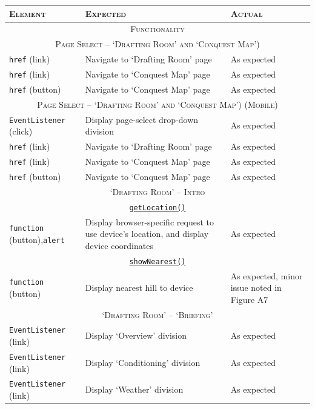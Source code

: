 \documentclass[11pt, english]{article}
\begin{document}
	\begin{center}
		\scriptsize
	\begin{longtable}{p{3cm}p{8cm}p{2cm}}
		\textsc{Element} & \textsc{Expected} & \textsc{Actual}\\
		\hline
		\hline
		\multicolumn{3}{c}{\textsc{Functionality}}\\
		\hline
		\hline
		\multicolumn{3}{c}{\textsc{Page Select -- `Drafting Room' and `Conquest Map')}}\\
		\hline
		\texttt{href} (link) & Navigate to `Drafting Room' page & As expected\\
		\texttt{href} (link) & Navigate to `Conquest Map' page & As expected\\
		\texttt{href} (button) & Navigate to `Conquest Map' page & As expected\\
		\hline
		\multicolumn{3}{c}{\textsc{Page Select -- `Drafting Room' and `Conquest Map') (Mobile)}}\\
		\hline
		\texttt{EventListener} (click) & Display page-select drop-down division & As expected\\
		\texttt{href} (link) & Navigate to `Drafting Room' page & As expected\\
		\texttt{href} (link) & Navigate to `Conquest Map' page & As expected\\
		\texttt{href} (button) & Navigate to `Conquest Map' page & As expected\\
		\hline
		\multicolumn{3}{c}{\textsc{`Drafting Room' -- Intro}}\\
		\hline
		\multicolumn{3}{c}{\underline{\texttt{getLocation()}}}\\
		\texttt{function} (button),\newline \texttt{alert} & Display browser-specific request to use device's location, and display device coordinates & As expected\\
		\multicolumn{3}{c}{\underline{\texttt{showNearest()}}}\\
		\texttt{function} (button) & Display nearest hill to device & As expected, minor issue noted in Figure A7\\
		\hline
		\multicolumn{3}{c}{\textsc{`Drafting Room' -- `Briefing'}}\\
		\hline
		\texttt{EventListener} (link) & Display `Overview' division & As expected\\
		\texttt{EventListener} (link) & Display `Conditioning' division & As expected\\
		\texttt{EventListener} (link) & Display `Weather' division & As expected\\

\end{longtable}
\end{center}
\end{document}
